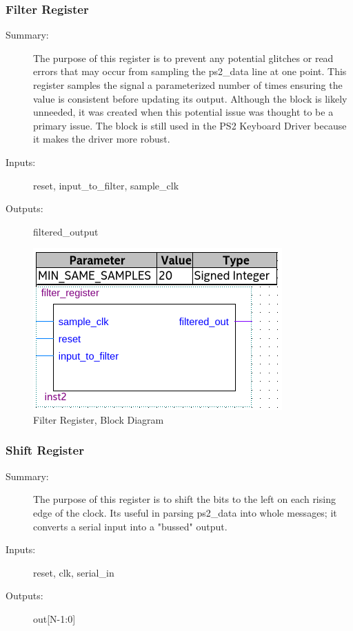 \documentclass[a4paper]{article}
\begin{document}
    \subsubsection{Filter Register}
        \begin{description}
            \item[Summary: ] The purpose of this register is to prevent any potential glitches or read errors that may occur from sampling the ps2\_data line at one point.  This register samples the signal a parameterized number of times ensuring the value is consistent before updating its output.  Although the block is likely unneeded, it was created when this potential issue was thought to be a primary issue.  The block is still used in the PS2 Keyboard Driver because it makes the driver more robust.
            \item[Inputs: ] reset, input\_to\_filter, sample\_clk
            \item[Outputs: ] filtered\_output
        \end{description}
        
        \vspace{.25 in}
        \begin{figure}[h]
          \centering
            \includegraphics[width=.5\textwidth]{Images/silas_blocks/filter_reg_bd.png}
        	\caption{Filter Register, Block Diagram}
            \label{fig:filter_reg_bd}
        \end{figure}
    \subsubsection{Shift Register}
        \begin{description}
            \item[Summary: ] The purpose of this register is to shift the bits to the left on each rising edge of the clock.  Its useful in parsing ps2\_data into whole messages;  it converts a serial input into a "bussed" output.
            \item[Inputs: ] reset, clk, serial\_in
            \item[Outputs: ] out[N-1:0]
        \end{description}
        
\end{document}
